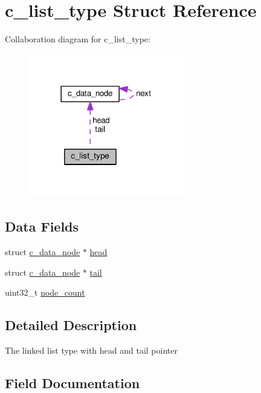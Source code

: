 \hypertarget{structc__list__type}{}\section{c\+\_\+list\+\_\+type Struct Reference}
\label{structc__list__type}


Collaboration diagram for c\+\_\+list\+\_\+type\+:\nopagebreak
\begin{figure}[H]
\begin{center}
\leavevmode
\includegraphics[width=192pt]{dd/db5/structc__list__type__coll__graph}
\end{center}
\end{figure}
\subsection*{Data Fields}
\begin{DoxyCompactItemize}
\item 
struct \hyperlink{structc__data__node}{c\+\_\+data\+\_\+node} $\ast$ \hyperlink{structc__list__type_ab42be6da380f1295613db5f97036b528}{head}
\item 
struct \hyperlink{structc__data__node}{c\+\_\+data\+\_\+node} $\ast$ \hyperlink{structc__list__type_a30f8e4d675eb4471d1f2829dbea5ccea}{tail}
\item 
uint32\+\_\+t \hyperlink{structc__list__type_a1b43f68c2d70340e5d0f56972b870a36}{node\+\_\+count}
\end{DoxyCompactItemize}


\subsection{Detailed Description}
The linked list type with head and tail pointer 

\subsection{Field Documentation}
